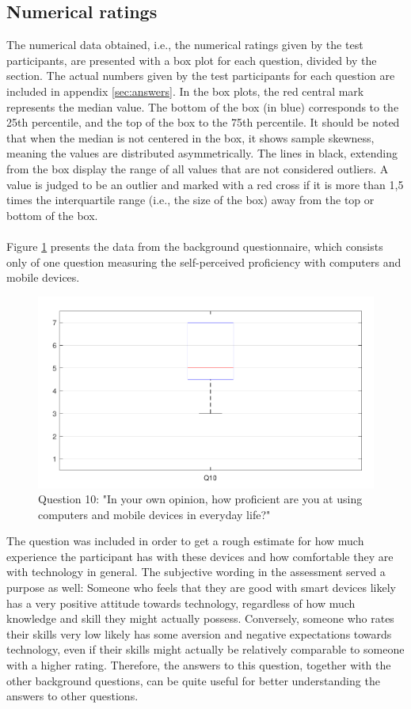 \documentclass[english, 12pt, a4paper, pdftex, elec, utf8]{aaltothesis}
\begin{document}
\subsection{Numerical ratings} \label{sec:numerical}

The numerical data obtained, i.e., the numerical ratings given by the test participants, are presented with a box plot for each question, divided by the section. The actual numbers given by the test participants for each question are included in appendix \ref{sec:answers}. In the box plots, the red central mark represents the median value. The bottom of the box (in blue) corresponds to the 25th percentile, and the top of the box to the 75th percentile. It should be noted that when the median is not centered in the box, it shows sample skewness, meaning the values are distributed asymmetrically. The lines in black, extending from the box display the range of all values that are not considered outliers. A value is judged to be an outlier and marked with a red cross if it is more than 1,5 times the interquartile range (i.e., the size of the box) away from the top or bottom of the box. \cite{boxplot} \\\\
Figure \ref{fig:results1} presents the data from the background questionnaire, which consists only of one question measuring the self-perceived proficiency with computers and mobile devices. 
\begin{figure}[t]
	\centering
	\includegraphics[width=\textwidth]{T2_box1.pdf}
	\caption{Question 10: "In your own opinion, how proficient are you at using computers and mobile devices in everyday life?"}
	\label{fig:results1} 
\end{figure}
The question was included in order to get a rough estimate for how much experience the participant has with these devices and how comfortable they are with technology in general. The subjective wording in the assessment served a purpose as well: Someone who feels that they are good with smart devices likely has a very positive attitude towards technology, regardless of how much knowledge and skill they might actually possess. Conversely, someone who rates their skills very low likely has some aversion and negative expectations towards technology, even if their skills might actually be relatively comparable to someone with a higher rating. Therefore, the answers to this question, together with the other background questions, can be quite useful for better understanding the answers to other questions. \\\\
\end{document}

